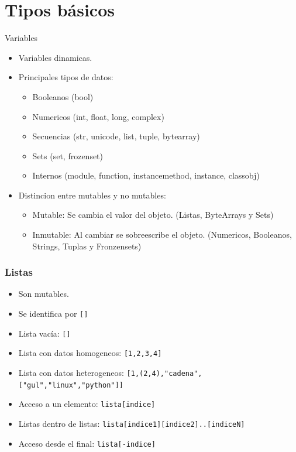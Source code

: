 \documentclass[10pt]{beamer}
\begin{document}
  \section*{Tipos básicos}
  \begin{frame}{Variables}
    \begin{itemize}
      \item Variables dinamicas.
      \item Principales tipos de datos:
      \begin{itemize}
        \item Booleanos (bool)
        \item Numericos (int, float, long, complex)
        \item Secuencias (str, unicode, list, tuple, bytearray)
        \item Sets (set, frozenset)
        \item Internos (module, function, instancemethod, instance, classobj)
      \end{itemize}
      \item Distincion entre mutables y no mutables:
      \begin{itemize}
        \item Mutable: Se cambia el valor del objeto. (Listas, ByteArrays y Sets)
        \item Inmutable: Al cambiar se sobreescribe el objeto. (Numericos, Booleanos, Strings, Tuplas y Fronzensets)
      \end{itemize}
    \end{itemize}
  \end{frame}

  \begin{frame}[containsverbatim]
    \frametitle{Listas}
    \begin{itemize}
        \item Son mutables.
        \item Se identifica por \verb+[]+
        \item Lista vacía: \verb+[]+
        \item Lista con datos homogeneos: \verb+[1,2,3,4]+
        \item Lista con datos heterogeneos: \verb+[1,(2,4),"cadena",["gul","linux","python"]]+
        \item Acceso a un elemento: \verb+lista[indice]+
        \item Listas dentro de listas: \verb+lista[indice1][indice2]..[indiceN]+
        \item Acceso desde el final: \verb+lista[-indice]+
    \end{itemize}
  \end{frame}
\end{document}
